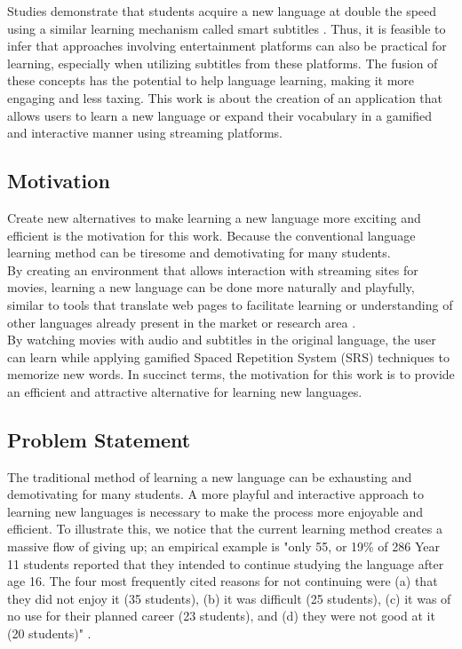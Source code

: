 \documentclass[12pt]{article}
\begin{document}
Studies demonstrate that students acquire a new language at double the speed using a similar learning mechanism called smart subtitles \cite{Kovacs13}. Thus, it is feasible to infer that approaches involving entertainment platforms can also be practical for learning, especially when utilizing subtitles from these platforms.
The fusion of these concepts has the potential to help language learning, making it more engaging and less taxing. This work is about the creation of an application that allows users to learn a new language or expand their vocabulary in a gamified and interactive manner using streaming platforms.

\subsection{Motivation}
 Create new alternatives to make learning a new language more exciting and efficient is the motivation for this work. Because the conventional language learning method can be tiresome and demotivating for many students. \\
By creating an environment that allows interaction with streaming sites for movies, learning a new language can be done more naturally and playfully, similar to tools that translate web pages to facilitate learning or understanding of other languages already present in the market or research area \cite{ElBatanony21}. \\
By watching movies with audio and subtitles in the original language, the user can learn while applying gamified Spaced Repetition System (SRS) techniques to memorize new words. In succinct terms, the motivation for this work is to provide an efficient and attractive alternative for learning new languages.

\subsection{Problem Statement}
The traditional method of learning a new language can be exhausting and demotivating for many students. A more playful and interactive approach to learning new languages is necessary to make the process more enjoyable and efficient. 
To illustrate this, we notice that the current learning method creates a massive flow of giving up; an empirical example is "only 55, or 19\% of 286 Year 11 students reported that they intended to continue studying the language after age 16. The four most frequently cited reasons for not continuing were (a) that they did not enjoy it (35 students), (b) it was difficult (25 students), (c) it was of no use for their planned career (23 students), and (d) they were not good at it (20 students)" \cite{Graham1}. 
\end{document}
